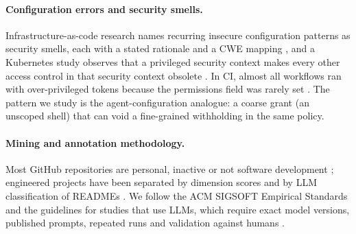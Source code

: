 \paragraph{Configuration errors and security smells.}
\label{sec:rw-smells}
Infrastructure-as-code research names recurring insecure configuration patterns as security
smells, each with a stated rationale and a CWE mapping \citep{rahman2019seven,rahman2021security}, and a Kubernetes
study observes that a privileged security context makes every other access control in that security context obsolete
\citep[\S2.3]{rahman2023security}. In CI, almost all workflows ran with over-privileged tokens because the permissions
field was rarely set \citep{koishybayev2022characterizing}. The pattern we study is the agent-configuration analogue: a
coarse grant (an unscoped shell) that can void a fine-grained withholding in the same policy.

\paragraph{Mining and annotation methodology.}
\label{sec:rw-method}
Most GitHub repositories are personal, inactive or not software development
\citep{kalliamvakou2016promises}; engineered projects have been separated by dimension scores
\citep{munaiah2017curating} and by LLM classification of READMEs \citep{Galster2026Dataset}. We follow the ACM SIGSOFT
Empirical Standards \citep{ralph2021empirical} and the guidelines for studies that use LLMs, which require exact model
versions, published prompts, repeated runs and validation against humans \citep{baltes2026guidelines,ahmed2025llms}.
